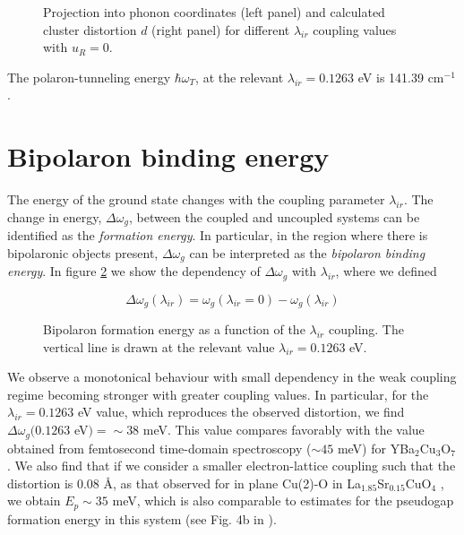 \begin{figure}[ht]
  \centering
  
  \caption{Projection into phonon coordinates (left panel) and calculated cluster distortion $d$ (right panel) for different $\lambda_{ir}$ coupling values with $u_R=0$.}
  \label{fig:uir-vs-coupl}
\end{figure}

The polaron-tunneling energy $\hbar\omega_T$, at the relevant $\lambda_{ir}=0.1263$ eV is 141.39 cm$^{-1}$.

\section{Bipolaron binding energy}
\label{sec:grd-binding-energy}

The energy of the ground state changes with the coupling parameter $\lambda_{ir}$.
The change in energy, $\Delta\omega_{g}$, between the coupled and uncoupled systems can be identified as the \textit{formation energy}.
In particular, in the region where there is bipolaronic objects present, $\Delta\omega_{g}$ can be interpreted as the \textit{bipolaron binding energy}. 
In figure \ref{fig:polaronFormation} we show the dependency of $\Delta\omega_{g}$ with $\lambda_{ir}$, where we defined

\begin{equation}
  \label{eq:pol-energy}
  \Delta\omega_{g}(\lambda_{ir}) = \omega_{g}(\lambda_{ir} = 0) - \omega_{g}(\lambda_{ir})
\end{equation}

\begin{figure}[ht]
  \centering
  
  \caption{Bipolaron formation energy as a function of the $\lambda_{ir}$ coupling. The vertical line is drawn at the relevant value $\lambda_{ir}=0.1263$ eV.}
  \label{fig:polaronFormation}
\end{figure}

We observe a monotonical behaviour with small dependency in the weak coupling regime becoming stronger with greater coupling values.
In particular, for the $\lambda_{ir}=0.1263$ eV value, which reproduces the observed distortion, we find $\Delta\omega_{g}(0.1263$ eV$) = \sim 38$ meV.
This value compares favorably with the value obtained from femtosecond time-domain spectroscopy ($\sim 45$ meV) for YBa$_2$Cu$_3$O$_7$ \cite{Demsar1999}. 
We also find that if we consider a smaller electron-lattice coupling such that the distortion is 0.08 \AA, as that observed for in plane Cu(2)-O in La$_{1.85}$Sr$_{0.15}$CuO$_4$ \cite{Bianconi1996}, we obtain $E_p \sim 35$ meV, which is also comparable to estimates for the pseudogap formation energy in this system (see Fig. 4b in \cite{Kusar2005}).

